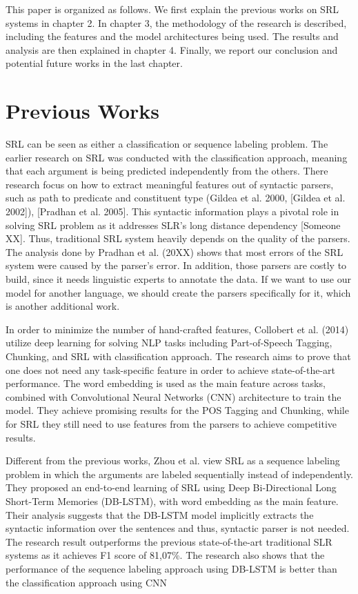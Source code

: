 This paper is organized as follows. We first explain the previous works on SRL systems in chapter 2. In chapter 3, the methodology of the research is described, including the features and the model architectures being used. The results and analysis are then explained in chapter 4. Finally, we report our conclusion and potential future works in the last chapter.

\section{Previous Works}
SRL can be seen as either a classification or sequence labeling problem. The earlier research on SRL was conducted with the classification approach, meaning that each argument is being predicted independently from the others. There research focus on how to extract meaningful features out of syntactic parsers, such as path to predicate and constituent type (Gildea et al. 2000, [Gildea et al. 2002]), [Pradhan et al. 2005]. This syntactic information plays a pivotal role in solving SRL problem as it addresses SLR’s long distance dependency [Someone XX]. Thus, traditional SRL system heavily depends on the quality of the parsers. The analysis done by Pradhan et al. (20XX) shows that most errors of the SRL system were caused by the parser's error. In addition, those parsers are costly to build, since it needs linguistic experts to annotate the data. If we want to use our model for another language, we should create the parsers specifically for it, which is another additional work.

In order to minimize the number of hand-crafted features, Collobert et al. (2014) utilize deep learning for solving NLP tasks including Part-of-Speech Tagging, Chunking, and SRL with classification approach. The research aims to prove that one does not need any task-specific feature in order to achieve state-of-the-art performance. The word embedding is used as the main feature across tasks, combined with Convolutional Neural Networks (CNN) architecture to train the model. They achieve promising results for the POS Tagging and Chunking, while for SRL they still need to use features from the parsers to achieve competitive results.

Different from the previous works, Zhou et al. view SRL as a sequence labeling problem in which the arguments are labeled sequentially instead of independently. They proposed an end-to-end learning of SRL using Deep Bi-Directional Long Short-Term Memories (DB-LSTM), with word embedding as the main feature. Their analysis suggests that the DB-LSTM model implicitly extracts the syntactic information over the sentences and thus, syntactic parser is not needed. The research result outperforms the previous state-of-the-art traditional SLR systems as it achieves F1 score of 81,07\%. The research also shows that the performance of the sequence labeling approach using DB-LSTM is better than the classification approach using CNN

